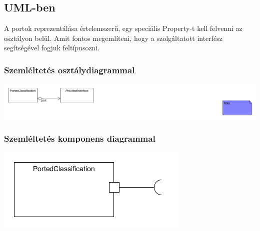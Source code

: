 \documentclass[a4paper,12pt]{report}
\begin{document}
\subsection{UML-ben}
A portok reprezentálása értelemszerű, egy speciális Property-t kell felvenni az osztályon belül. Amit fontos megemlíteni, hogy a szolgáltatott interfész segítségével fogjuk feltípusozni. 


\subsubsection{Szemléltetés osztálydiagrammal}
\includegraphics[scale=0.7]{uml_port_class.png}

\subsubsection{Szemléltetés komponens diagrammal}
\includegraphics[scale=0.7]{uml_port_comp.png}
\end{document}
